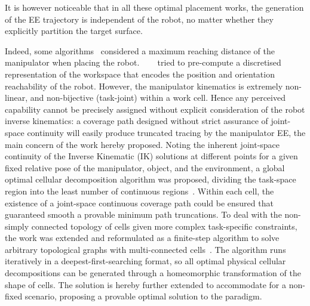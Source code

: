 \documentclass[letterpaper,journal]{IEEEtran}
\begin{document}
It is however noticeable that in all these optimal placement works, the generation of the EE trajectory is independent of the robot, no matter whether they explicitly partition the target surface. 

Indeed, some algorithms~\cite{Vahrenkamp2013Robot} considered a maximum reaching distance of the manipulator when placing the robot.
~\cite{Zacharias2007Capturing}~\cite{Zacharias2009Using}~\cite{Malhan2019Identifying} tried to pre-compute a discretised representation of the workspace that encodes the position and orientation reachability of the robot. 
However, the manipulator kinematics is extremely non-linear, and non-bijective (task-joint) within a work cell. Hence any perceived capability cannot be precisely assigned without explicit consideration of the robot inverse kinematics: a coverage path designed without strict assurance of joint-space continuity will easily produce truncated tracing by the manipulator EE, the main concern of the work hereby proposed. 
Noting the inherent joint-space continuity of the Inverse Kinematic (IK) solutions at different points for a given fixed relative pose of the manipulator, object, and the environment, a global optimal cellular decomposition algorithm was proposed, dividing the task-space region into the least number of continuous regions~\cite{Yang2020Cellular}. Within each cell, the existence of a joint-space continuous coverage path could be ensured that guaranteed smooth a provable minimum path truncations. To deal with the non-simply connected topology of cells given more complex task-specific constraints, the work was extended and reformulated as a finite-step algorithm to solve arbitrary topological graphs with multi-connected cells~\cite{Yang2020Nonrevisiting}. 
The algorithm runs iteratively in a deepest-first-searching format, so all optimal physical cellular decompositions can be generated through a homeomorphic transformation of the shape of cells. The solution is hereby further extended to accommodate for a non-fixed scenario, proposing a provable optimal solution to the paradigm.
\end{document}
